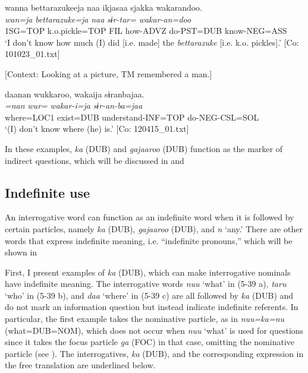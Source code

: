  \ea \label{ex:5:a} %
\glll  wanna  {\textbar}bettarazukee{\textbar}ja  naa  ikjasaa  sjakka  wakarandoo.\\
\textit{wan=ja}  \textit{bettarazuke=ja}  \textit{naa}  \textit{}  \textit{sɨr-tar=}  \textit{wakar-an=doo}\\
1SG=TOP  k.o.pickle=TOP  FIL  how-ADVZ  do-PST=DUB  know-NEG=ASS\\
\glt ‘I don’t know how much (I) did [i.e. made] the \textit{bettarazuke} [i.e. k.o. pickles].’ [Co: 101023\_01.txt]

 \ex \label{ex:5:b} [Context: Looking at a picture, TM remembered a man.]

\glll  daanan  wukkaroo,  wakaija  sɨranbajaa.\\
\textit{=nan}  \textit{wur=}  \textit{wakar-i=ja}  \textit{sɨr-an-ba=jaa}\\
where=LOC1  exist=DUB  understand-INF=TOP  do-NEG-CSL=SOL\\
\glt ‘(I) don’t know where (he) is.’ [Co: 120415\_01.txt]
\z
\z

In these examples, \textit{ka} (DUB) and \textit{gajaaroo} (DUB) function as the marker of indirect questions, which will be discussed in  and 

\subsection{Indefinite use}

An interrogative word can function as an indefinite word when it is followed by certain particles, namely \textit{ka} (DUB), \textit{gajaaroo} (DUB), and \textit{n} ‘any.’ There are other words that express indefinite meaning, i.e. “indefinite pronouns,” which will be shown in 

  First, I present examples of \textit{ka} (DUB), which can make interrogative nominals have indefinite meaning. The interrogative words \textit{nuu} ‘what’ in (5-39 a), \textit{taru} ‘who’ in (5-39 b), and \textit{daa} ‘where’ in (5-39 c) are all followed by \textit{ka} (DUB) and do not mark an information question but instead indicate indefinite referents. In particular, the first example takes the nominative particle, as in \textit{nuu=ka=nu} (what=DUB=NOM), which does not occur when \textit{nuu} ‘what’ is used for questions since it takes the focus particle \textit{ga} (FOC) in that case, omitting the nominative particle (see ). The interrogatives, \textit{ka} (DUB), and the corresponding expression in the free translation are underlined below.

